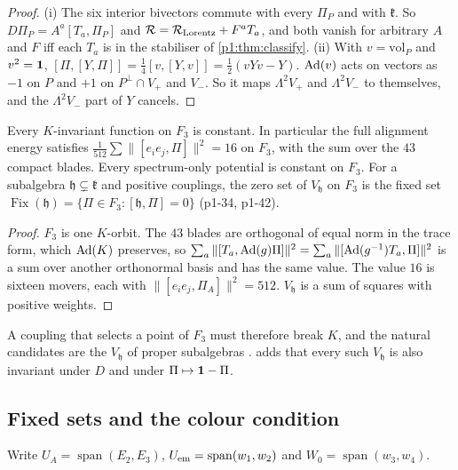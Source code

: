 \begin{proof}
(i) The six interior bivectors commute with every $\Pi_P$ and with $\mathfrak k$. So $D\Pi_P=A^a[T_a,\Pi_P]$ and $\mathcal R=\mathcal R_{\rm Lorentz}+F^aT_a$, and both vanish
for arbitrary $A$ and $F$ iff each $T_a$ is in the stabiliser of \cref{p1:thm:classify}. (ii) With $v=\mathrm{vol}_P$ and $v^2=\mathbf 1$,
$[\Pi,[Y,\Pi]]=\tfrac14[v,[Y,v]]=\tfrac12(vYv-Y)$. $\operatorname{Ad}(v)$ acts on vectors as $-1$ on $P$ and $+1$ on $P^\perp\cap V_+$ and $V_-$. So it maps $\Lambda^2V_+$ and
$\Lambda^2V_-$ to themselves, and the $\Lambda^2V_-$ part of $Y$ cancels.
\end{proof}

\begin{proposition}
\label{p1:prop:K}
Every $K$-invariant function on $F_3$ is constant. In particular the full alignment energy satisfies $\tfrac1{512}\sum\|[e_ie_j,\Pi]\|^2=16$ on $F_3$, with the sum over the $43$
compact blades. Every spectrum-only potential is constant on $F_3$. For a subalgebra $\mathfrak h\subsetneq\mathfrak k$ and positive couplings, the zero set of $V_{\mathfrak h}$ on
$F_3$ is the fixed set $\operatorname{Fix}(\mathfrak h)=\{\Pi\in F_3:[\mathfrak h,\Pi]=0\}$ (p1-34, p1-42).
\end{proposition}

\begin{proof}
$F_3$ is one $K$-orbit. The $43$ blades are orthogonal of equal norm in the trace form, which $\operatorname{Ad}(K)$ preserves, so $\sum_a\|[T_a,\operatorname{Ad}(g)\Pi]\|^2=\sum_a\|[\operatorname{Ad}(g^{-1})T_a,\Pi]\|^2$
is a sum over another orthonormal basis and has the same value. The value $16$ is sixteen movers, each with $\|[e_ie_j,\Pi_A]\|^2=512$. $V_{\mathfrak h}$ is a sum of
squares with positive weights.
\end{proof}

A coupling that selects a point of $F_3$ must therefore break $K$, and the natural candidates are the $V_{\mathfrak h}$ of proper subalgebras
\cite{Peskin80,Preskill81}.  adds that every such $V_{\mathfrak h}$ is also invariant under $D$ and under $\Pi\mapsto\mathbf 1-\Pi$.

\subsection{Fixed sets and the colour condition}
\label{p1:sec:fixed}

Write $U_A=\operatorname{span}(E_2,E_3)$, $U_{\rm em}=\operatorname{span}(w_1,w_2)$ and $W_0=\operatorname{span}(w_3,w_4)$.


